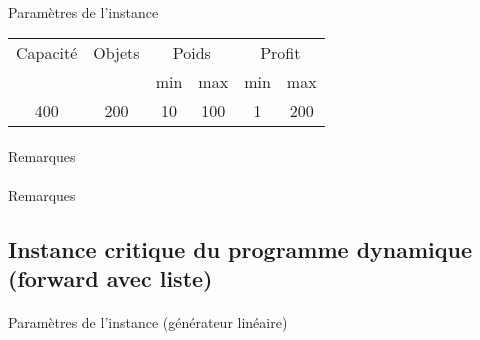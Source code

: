 \documentclass[12pt]{article}
\begin{document}
\paragraph{}Paramètres de l'instance

\begin{tabular}{|c|c|c|c|c|c|}
	\hline
	Capacité & Objets & \multicolumn{2}{c|}{Poids} & \multicolumn{2}{c|}{Profit} \\
	\cline{3-6}
		& & min & max & min & max \\
	\hline
	400 & 200 & 10 & 100 & 1 & 200 \\
	\hline
\end{tabular}


\paragraph{}Remarques

\begin{figure}[!h]
\begin{floatrow}
\end{floatrow}
\end{figure}

\paragraph{}Remarques

\subsection{Instance critique du programme dynamique (forward avec liste)}

\paragraph{}Paramètres de l'instance (générateur linéaire)
\end{document}
